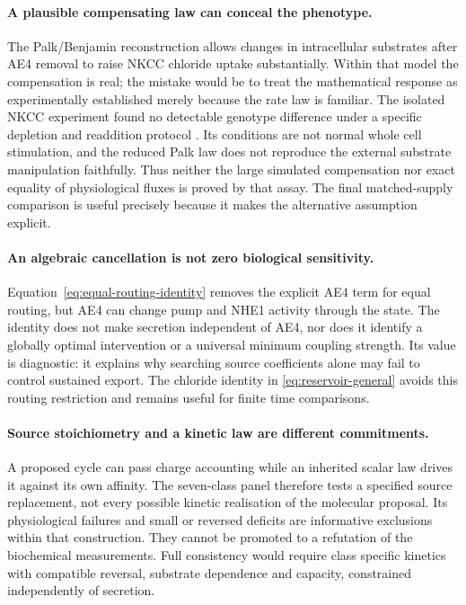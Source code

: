 \paragraph{A plausible compensating law can conceal the phenotype.}
The Palk/Benjamin reconstruction allows changes in intracellular substrates after AE4 removal to raise NKCC chloride uptake substantially. Within that model the compensation is real; the mistake would be to treat the mathematical response as experimentally established merely because the rate law is familiar. The isolated NKCC experiment found no detectable genotype difference under a specific depletion and readdition protocol \citep{Pena2015}. Its conditions are not normal whole cell stimulation, and the reduced Palk law does not reproduce the external substrate manipulation faithfully. Thus neither the large simulated compensation nor exact equality of physiological fluxes is proved by that assay. The final matched-supply comparison is useful precisely because it makes the alternative assumption explicit.

\paragraph{An algebraic cancellation is not zero biological sensitivity.}
Equation~\eqref{eq:equal-routing-identity} removes the explicit AE4 term for equal routing, but AE4 can change pump and NHE1 activity through the state. The identity does not make secretion independent of AE4, nor does it identify a globally optimal intervention or a universal minimum coupling strength. Its value is diagnostic: it explains why searching source coefficients alone may fail to control sustained export. The chloride identity in \cref{eq:reservoir-general} avoids this routing restriction and remains useful for finite time comparisons.

\paragraph{Source stoichiometry and a kinetic law are different commitments.}
A proposed cycle can pass charge accounting while an inherited scalar law drives it against its own affinity. The seven-class panel therefore tests a specified source replacement, not every possible kinetic realisation of the molecular proposal. Its physiological failures and small or reversed deficits are informative exclusions within that construction. They cannot be promoted to a refutation of the biochemical measurements. Full consistency would require class specific kinetics with compatible reversal, substrate dependence and capacity, constrained independently of secretion.

